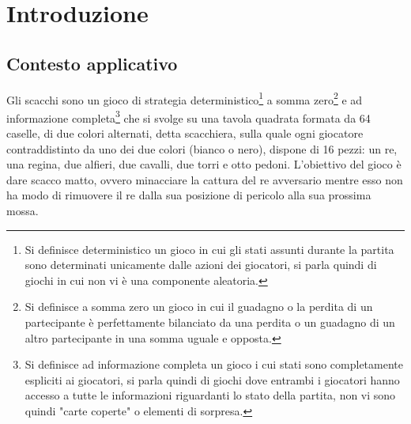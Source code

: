 \chapter{Introduzione}

\section{Contesto applicativo} %
Gli scacchi sono un gioco di strategia deterministico\footnote{Si definisce deterministico un gioco in cui gli stati assunti durante la partita sono determinati
unicamente dalle azioni dei giocatori, si parla quindi di giochi in cui non vi è una componente aleatoria.} a somma zero\footnote{Si definisce a somma zero un gioco in cui il guadagno o la perdita di un partecipante è perfettamente bilanciato da una perdita o un guadagno di un altro partecipante in una somma uguale e opposta.} e ad informazione completa\footnote{Si definisce ad informazione completa un gioco i cui stati sono
completamente espliciti ai giocatori, si parla quindi di giochi dove entrambi i giocatori hanno accesso a tutte le informazioni riguardanti lo stato della partita, non vi sono quindi "carte coperte" o elementi di sorpresa.}  
che si svolge su una tavola quadrata formata da 64 caselle, di due colori alternati,
detta scacchiera, sulla quale ogni giocatore contraddistinto da uno dei due colori (bianco o nero), dispone di 16 pezzi: un re, una regina, due alfieri, due cavalli, due torri e otto pedoni.
L'obiettivo del gioco è dare scacco matto, ovvero minacciare la cattura del re avversario mentre esso non
ha modo di rimuovere il re dalla sua posizione di pericolo alla sua prossima mossa.



